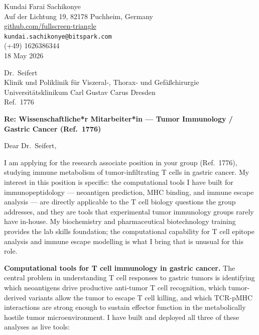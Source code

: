 \documentclass[12pt,a4paper]{article}
\begin{document}
\begin{flushright}
Kundai Farai Sachikonye \\
Auf der Lichtung 19, 82178 Puchheim, Germany \\
\href{https://github.com/fullscreen-triangle}{github.com/fullscreen-triangle} \\
\texttt{kundai.sachikonye@bitspark.com} \\
(+49) 1626386344 \\[6pt]
18 May 2026
\end{flushright}

\vspace{1em}

Dr.\ Seifert \\
Klinik und Poliklinik für Viszeral-, Thorax- und Gefäßchirurgie \\
Universitätsklinikum Carl Gustav Carus Dresden \\
Ref.\ 1776

\vspace{1.5em}

\textbf{Re: Wissenschaftliche*r Mitarbeiter*in --- Tumor Immunology / Gastric Cancer (Ref.\ 1776)}

\vspace{1em}

Dear Dr.\ Seifert,

I am applying for the research associate position in your group (Ref.\ 1776),
studying immune metabolism of tumor-infiltrating T cells in gastric cancer.
My interest in this position is specific: the computational tools I have built
for immunopeptidology --- neoantigen prediction, MHC binding, and immune escape
analysis --- are directly applicable to the T cell biology questions the group
addresses, and they are tools that experimental tumor immunology groups rarely
have in-house. My biochemistry and pharmaceutical biotechnology training provides
the lab skills foundation; the computational capability for T cell epitope analysis
and immune escape modelling is what I bring that is unusual for this role.

\textbf{Computational tools for T cell immunology in gastric cancer.}
The central problem in understanding T cell responses to gastric tumors is
identifying which neoantigens drive productive anti-tumor T cell recognition,
which tumor-derived variants allow the tumor to escape T cell killing, and
which TCR-pMHC interactions are strong enough to sustain effector function
in the metabolically hostile tumor microenvironment.
I have built and deployed all three of these analyses as live tools:
\end{document}
